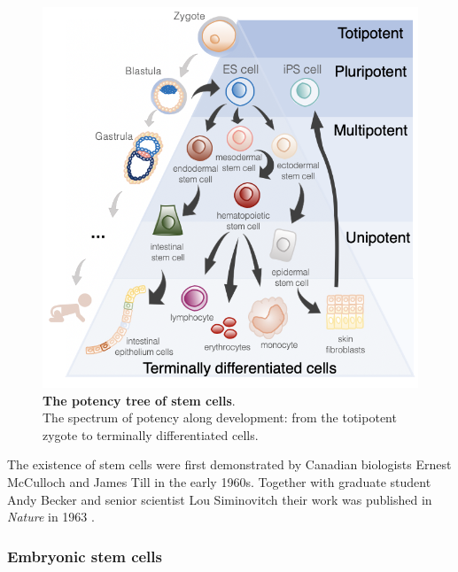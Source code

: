 \begin{figure}[htbp]
\centering
\includegraphics[width=16cm]{Chapter1/Fig/stem_cell_potency.png}
\caption[Stem Cells]{\textbf{The potency tree of stem cells}.\\
The spectrum of potency along development: from the totipotent zygote to terminally differentiated cells. 
}
\label{fig:stem_cells}
\end{figure}

The existence of stem cells were first demonstrated by Canadian biologists Ernest McCulloch and James Till in the early 1960s.
Together with graduate student Andy Becker and senior scientist Lou Siminovitch their work was published in \textit{Nature} in 1963 \cite{becker1963cytological}.

\subsubsection{Embryonic stem cells}

